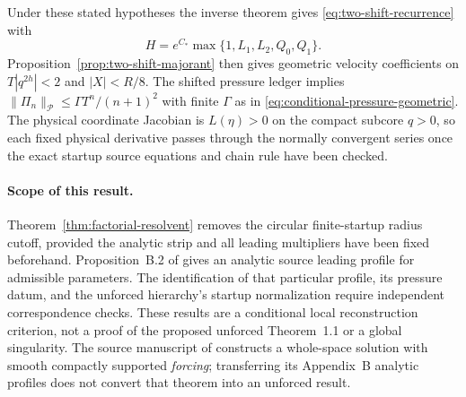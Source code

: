 Under these stated hypotheses the inverse theorem gives
\eqref{eq:two-shift-recurrence} with
\begin{equation}\label{eq:source-majorant-H}
 H=e^{C_*}\max\{1,L_1,L_2,Q_0,Q_1\}.
\end{equation}
Proposition~\ref{prop:two-shift-majorant} then gives geometric
velocity coefficients on $T|q^{2h}|<2$ and $|X|<R/8$.
The shifted pressure ledger implies
$\|\Pi_n\|_{\mathcal P}\le\Gamma T^n/(n+1)^2$
with finite $\Gamma$ as in \eqref{eq:conditional-pressure-geometric}.
The physical coordinate Jacobian is $L(\eta)>0$ on the compact
subcore $q>0$, so each fixed physical derivative passes through
the normally convergent series once the exact startup source
equations and chain rule have been checked.

\paragraph{Scope of this result.}
Theorem~\ref{thm:factorial-resolvent} removes the circular
finite-startup radius cutoff, provided the analytic strip and all
leading multipliers have been fixed beforehand.
Proposition~B.2 of \cite{openai2026} gives an analytic source
leading profile for admissible parameters. The identification
of that particular profile, its pressure datum, and the unforced
hierarchy's startup normalization require independent correspondence
checks. These results are a conditional local reconstruction criterion,
not a proof of the proposed unforced Theorem~1.1 or a global singularity.
The source manuscript of \cite{openai2026} constructs a whole-space solution
with smooth compactly supported \emph{forcing}; transferring its
Appendix~B analytic profiles does not convert that theorem into an
unforced result.
